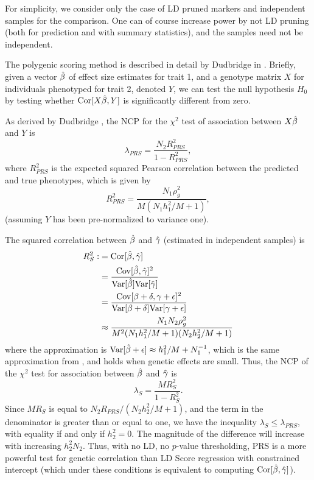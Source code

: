\documentclass[11pt]{article}
\numberwithin{equation}{section}
\numberwithin{definition}{section}
\numberwithin{thm}{section}
\numberwithin{lemma}{section}
\numberwithin{prop}{section}
\numberwithin{cor}{section}
\numberwithin{hyp}{section}
\begin{document}
For simplicity, we consider only the case of LD pruned markers and independent samples for the
comparison. 
One can of course increase power by not LD pruning (both for prediction and with summary statistics), and the 
samples need not be independent.

The polygenic scoring method is described in detail by Dudbridge in \cite{dudbridge2013power}. 
Briefly, given a vector $\hat{\beta}$ of effect size estimates for trait 1, and a genotype matrix $X$ for individuals phenotyped for
trait 2, denoted $Y$, we can test the null hypothesis $H_0$ by testing whether $\mathrm{Cor}[X\hat{\beta}, Y]$ is significantly different
from zero.

As derived by Dudbridge \cite{dudbridge2013power}, the NCP for the $\chi^2$ test of association between $X\hat{\beta}$ and $Y$ is 
\begin{equation}
	\lambda_{PRS} = \dfrac{N_2R^2_{PRS}}{1-R^2_{PRS}},
\end{equation}
where $R^2_{PRS}$ is the expected squared Pearson correlation between the predicted and true phenotypes, which is given by
\begin{equation}
	R^2_{PRS} = \dfrac{N_1\rho_g^2}{M(N_1h^2_1/M+1)},
\end{equation}
(assuming $Y$ has been pre-normalized to variance one).

The squared correlation between $\hat{\beta}$ and $\hat{\gamma}$ (estimated in independent samples) is
\begin{align*}
R^2_S :&= \mathrm{Cor}[\hat{\beta}, \hat{\gamma}]\\
&= 
	\dfrac{\mathrm{Cov}[\hat{\beta},\hat{\gamma}]^2}{\mathrm{Var}[\hat{\beta}]\mathrm{Var}[\hat{\gamma}]}\\
&=
	\dfrac{\mathrm{Cov}[\beta+\delta,\gamma+\epsilon]^2}{\mathrm{Var}[\beta+\delta]\mathrm{Var}[\gamma+\epsilon]}\\
&\approx
	\dfrac{N_1N_2\rho_g^2}{M^2(N_1h^2_1/M + 1)(N_2h^2_2/M + 1)}\\
\end{align*}
where the approximation is $\mathrm{Var}[\hat{\beta}+\epsilon] \approx h^2_1/M + N_1^{-1}$, which is the same approximation from 
\cite{dudbridge2013power}, and holds when genetic effects are small.
Thus, the NCP of the $\chi^2$ test for association between $\hat{\beta}$ and $\hat{\gamma}$ is 
\begin{equation}
	\lambda_{S} = \dfrac{MR^2_S}{1-R^2_S}.
\end{equation}
Since $MR_S$ is equal to $N_2R_{PRS} / (N_2h^2_2/M + 1)$, and the term in the denominator is greater than or equal to one, 
we have the inequality $\lambda_S \leq \lambda_{PRS}$, with equality if and only if $h^2_2 = 0$. 
The magnitude of the difference will increase with increasing $h^2_2N_2$. Thus, with no LD, no $p$-value
thresholding, PRS is a more powerful test for genetic correlation than LD Score regression with constrained intercept (which under
these conditions is equivalent to computing $\mathrm{Cor}[\hat{\beta},\hat{\gamma}]$).
\end{document}
